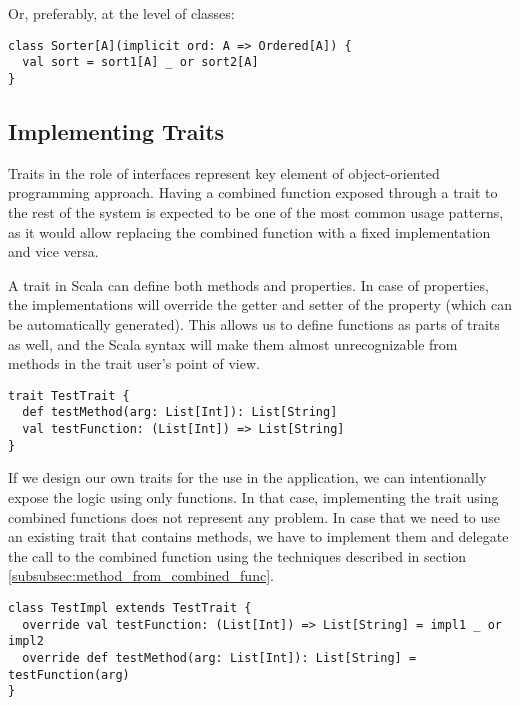 Or, preferably, at the level of classes:

\lstset{style=Scala}
\begin{lstlisting}
class Sorter[A](implicit ord: A => Ordered[A]) {
  val sort = sort1[A] _ or sort2[A]
}
\end{lstlisting}

\subsection{Implementing Traits}
Traits in the role of interfaces represent key element of object-oriented programming approach. Having a combined function exposed through a trait to the rest of the system is expected to be one of the most common usage patterns, as it would allow replacing the combined function with a fixed implementation and vice versa.

A trait in Scala can define both methods and properties. In case of properties, the implementations will override the getter and setter of the property (which can be automatically generated). This allows us to define functions as parts of traits as well, and the Scala syntax will make them almost unrecognizable from methods in the trait user's point of view.

\lstset{style=Scala}
\begin{lstlisting}
trait TestTrait {
  def testMethod(arg: List[Int]): List[String]
  val testFunction: (List[Int]) => List[String]
}
\end{lstlisting}

If we design our own traits for the use in the application, we can intentionally expose the logic using only functions. In that case, implementing the trait using combined functions does not represent any problem. In case that we need to use an existing trait that contains methods, we have to implement them and delegate the call to the combined function using the techniques described in section \ref{subsubsec:method_from_combined_func}.

\lstset{style=Scala}
\begin{lstlisting}
class TestImpl extends TestTrait {
  override val testFunction: (List[Int]) => List[String] = impl1 _ or impl2
  override def testMethod(arg: List[Int]): List[String] = testFunction(arg)
}
\end{lstlisting}


